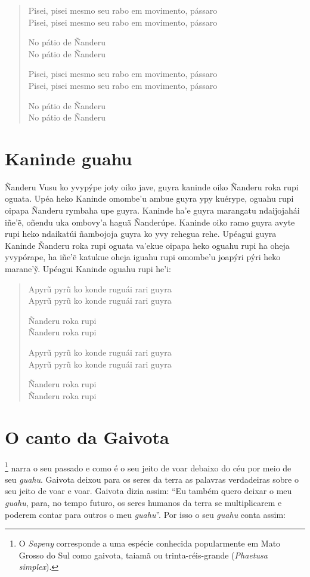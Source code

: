 \begin{verse}
Pisei, pisei mesmo seu rabo em movimento, pássaro\\
Pisei, pisei mesmo seu rabo em movimento, pássaro

No pátio de Ñanderu\\
No pátio de Ñanderu

Pisei, pisei mesmo seu rabo em movimento, pássaro\\
Pisei, pisei mesmo seu rabo em movimento, pássaro

No pátio de Ñanderu\\
No pátio de Ñanderu
\end{verse}

\chapter{Kaninde guahu}

Ñanderu Vusu ko yvypýpe joty oiko jave, guyra kaninde oiko Ñanderu roka
rupi oguata. Upéa heko Kaninde omombe'u ambue guyra ypy kuérype, oguahu
rupi oipapa Ñanderu rymbaha upe guyra. Kaninde ha'e guyra marangatu
ndaijojahái iñe'ẽ, oñendu uka ombovy'a haguã Ñanderúpe. Kaninde oiko
ramo guyra avyte rupi heko ndaikatúi ñambojoja guyra ko yvy rehegua
rehe. Upéagui guyra Kaninde Ñanderu roka rupi oguata va'ekue oipapa heko
oguahu rupi ha oheja yvypórape, ha iñe'ẽ katukue oheja iguahu rupi
omombe'u joapýri pýri heko marane'ỹ. Upéagui Kaninde oguahu rupi he'i:

\begin{verse}
Apyrũ pyrũ ko konde ruguái rari guyra\\
Apyrũ pyrũ ko konde ruguái rari guyra

Ñanderu roka rupi\\
Ñanderu roka rupi

Apyrũ pyrũ ko konde ruguái rari guyra\\
Apyrũ pyrũ ko konde ruguái rari guyra

Ñanderu roka rupi\\
Ñanderu roka rupi
\end{verse}

\chapter{O canto da Gaivota}

\footnote{O \emph{Sapeny} corresponde a uma espécie conhecida
  popularmente em Mato Grosso do Sul como gaivota, taiamã ou
  trinta-réis-grande (\emph{Phaetusa simplex}).} narra o seu passado e
como é o seu jeito de voar debaixo do céu por meio de seu \emph{guahu}.
Gaivota deixou para os seres da terra as palavras verdadeiras sobre o
seu jeito de voar e voar. Gaivota dizia assim: ``Eu também quero deixar
o meu \emph{guahu}, para, no tempo futuro, os seres humanos da terra se
multiplicarem e poderem contar para outros o meu \emph{guahu}''. Por
isso o seu \emph{guahu} conta assim:

